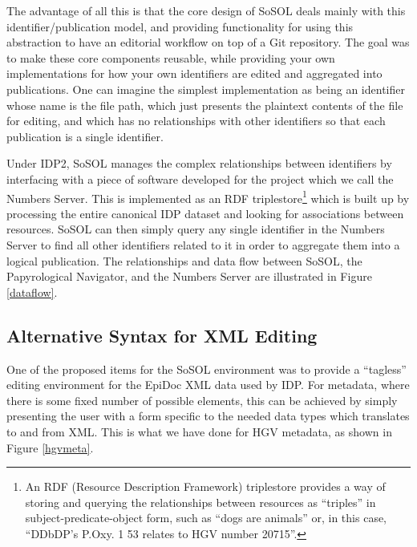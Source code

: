 \documentclass[]{article}
\begin{document}
The advantage of all this is that the core design of SoSOL deals mainly with this identifier/publication model, and providing functionality for using this abstraction to have an editorial workflow on top of a Git repository. The goal was to make these core components reusable, while providing your own implementations for how your own identifiers are edited and aggregated into publications. One can imagine the simplest implementation as being an identifier whose name is the file path, which just presents the plaintext contents of the file for editing, and which has no relationships with other identifiers so that each publication is a single identifier.

Under IDP2, SoSOL manages the complex relationships between identifiers by interfacing with a piece of software developed for the project which we call the Numbers Server. This is implemented as an RDF triplestore\footnote{\label{rdf}An RDF (Resource Description Framework) triplestore provides a way of storing and querying the relationships between resources as “triples” in subject-predicate-object form, such as “dogs are animals” or, in this case, “DDbDP's P.Oxy. 1 53 relates to HGV number 20715”.} which is built up by processing the entire canonical IDP dataset and looking for associations between resources. SoSOL can then simply query any single identifier in the Numbers Server to find all other identifiers related to it in order to aggregate them into a logical publication. The relationships and data flow between SoSOL, the Papyrological Navigator, and the Numbers Server are illustrated in Figure \ref{dataflow}.

\subsection*{Alternative Syntax for XML Editing}

One of the proposed items for the SoSOL environment was to provide a “tagless” editing environment for the EpiDoc XML data used by IDP. For metadata, where there is some fixed number of possible elements, this can be achieved by simply presenting the user with a form specific to the needed data types which translates to and from XML. This is what we have done for HGV metadata, as shown in Figure \ref{hgvmeta}.
\end{document}

